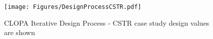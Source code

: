 \documentclass[journal]{IEEEtran}
\newcommand{\blue}[1]{\textcolor{blue}{#1}}
\begin{document}
\begin{figure}[]
\centering
\texttt{[image: Figures/DesignProcessCSTR.pdf]}
\caption{CLOPA Iterative Design Process - CSTR case study design values are shown}
\label{fig:Feedback-Design}
\end{figure}
\end{document}
